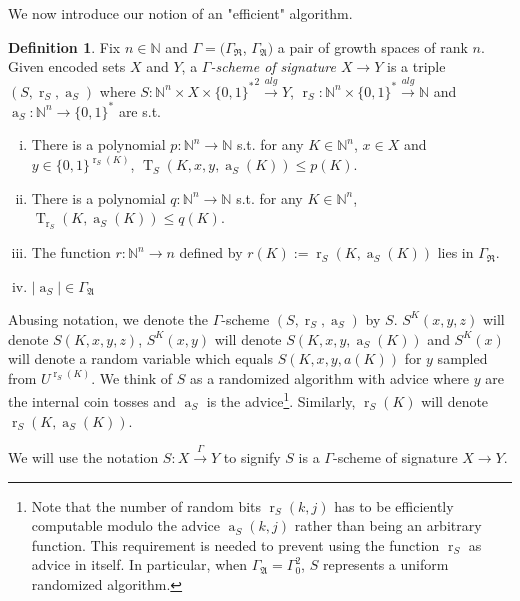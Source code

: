 \documentclass{article}
\theoremstyle{definition}
\newtheorem{definition}{Definition}[section]
\theoremstyle{plain}
\newcommand{\Words}{{\{ 0, 1 \}^*}}
\newcommand{\WordsLen}[1]{{\{ 0, 1 \}^{#1}}}
\DeclareMathOperator{\T}{T}
\DeclareMathOperator{\R}{r}
\DeclareMathOperator{\A}{a}
\newcommand{\Nats}{\mathbb{N}}
\newcommand{\Abs}[1]{\lvert #1 \rvert}
\begin{document}
We now introduce our notion of an "efficient" algorithm.

\begin{definition}

Fix $n \in \Nats$ and $\Gamma=(\Gamma_{\mathfrak{R}}$, $\Gamma_{\mathfrak{A}})$ a pair of growth spaces of rank $n$. Given encoded sets $X$ and $Y$, a \emph{$\Gamma$-scheme of signature $X \rightarrow Y$} is a triple $(S,\R_S,\A_S)$ where $S: \Nats^n \times X \times \Words^2 \xrightarrow{alg} Y$, $\R_S: \Nats^n \times \Words \xrightarrow{alg} \Nats$ and $\A_S: \Nats^n \rightarrow \Words$ are s.t.

\begin{enumerate}[(i)]

\item There is a polynomial $p: \Nats^n \rightarrow \Nats$ s.t. for any $K \in \Nats^n$, $x \in X$ and $y \in \WordsLen{\R_S(K)}$, $\T_S(K,x,y,\A_S(K)) \leq p(K)$.

\item There is a polynomial $q: \Nats^n \rightarrow \Nats$ s.t. for any $K \in \Nats^n$, ${\T_{\R_S}(K,\A_S(K)) \leq q(K)}$.

\item The function $r: \Nats^n \rightarrow n$ defined by $r(K):=\R_S(K,\A_S(K))$ lies in $\Gamma_{\mathfrak{R}}$.

\item $\Abs{\A_S} \in \Gamma_{\mathfrak{A}}$

\end{enumerate}

Abusing notation, we denote the $\Gamma$-scheme $(S,\R_S,\A_S)$ by $S$. $S^K(x,y,z)$ will denote $S(K,x,y,z)$, $S^K(x,y)$ will denote $S(K,x,y,\A_S(K))$ and $S^K(x)$ will denote a random variable which equals $S(K,x,y,a(K))$ for $y$ sampled from $U^{\R_S(K)}$. We think of $S$ as a randomized algorithm with advice where $y$ are the internal coin tosses and $\A_S$ is the advice\footnote{Note that the number of random bits $\R_S(k,j)$ has to be efficiently computable modulo the advice $\A_S(k,j)$ rather than being an arbitrary function. This requirement is needed to prevent using the function $\R_S$ as advice in itself. In particular, when $\Gamma_{\mathfrak{A}}=\Gamma_0^2$, $S$ represents a uniform randomized algorithm.}. Similarly, $\R_S(K)$ will denote $\R_S(K,\A_S(K))$.

We will use the notation $S: X \xrightarrow{\Gamma} Y$ to signify $S$ is a $\Gamma$-scheme of signature $X \rightarrow Y$.

\end{definition}
\end{document}
